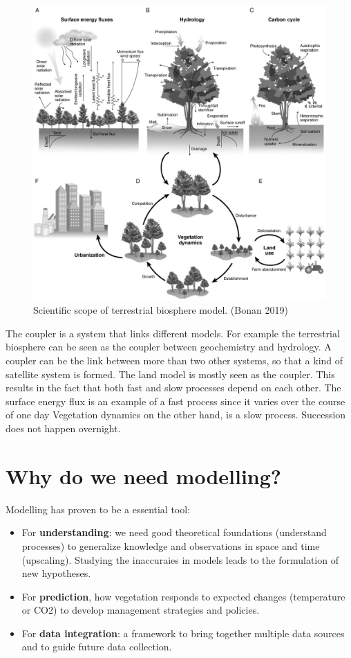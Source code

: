 \documentclass[12pt,oneside]{book}
\providecommand{\tightlist}{%
  \setlength{\itemsep}{0pt}\setlength{\parskip}{0pt}}
\begin{document}
\begin{figure}

{\centering \includegraphics[width=0.8\linewidth]{figures/chap1/cycles_bonan} 

}

\caption{Scientific scope of terrestrial biosphere model. (Bonan 2019)}\label{fig:f4}
\end{figure}

The coupler is a system that links different models. For example the
terrestrial biosphere can be seen as the coupler between geochemistry
and hydrology. A coupler can be the link between more than two other
systems, so that a kind of satellite system is formed. The land model is
mostly seen as the coupler. This results in the fact that both fast and
slow processes depend on each other. The surface energy flux is an
example of a fast process since it varies over the course of one day
Vegetation dynamics on the other hand, is a slow process. Succession
does not happen overnight.

\section{Why do we need modelling?}\label{why-do-we-need-modelling}

Modelling has proven to be a essential tool:

\begin{itemize}
\tightlist
\item
  For \textbf{understanding}: we need good theoretical foundations
  (understand processes) to generalize knowledge and observations in
  space and time (upscaling). Studying the inaccuraies in models leads
  to the formulation of new hypotheses.
\item
  For \textbf{prediction}, how vegetation responds to expected changes
  (temperature or CO2) to develop management strategies and policies.
\item
  For \textbf{data integration}: a framework to bring together multiple
  data sources and to guide future data collection.
\end{itemize}
\end{document}
